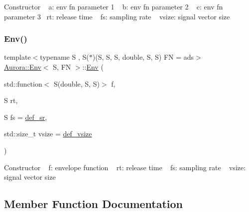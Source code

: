 Constructor ~\newline
a\+: env fn parameter 1 ~\newline
b\+: env fn parameter 2 ~\newline
c\+: env fn parameter 3~\newline
rt\+: release time ~\newline
fs\+: sampling rate ~\newline
vsize\+: signal vector size \mbox{\label{class_aurora_1_1_env_a500fe7e05d736a21c801ffa480aceed7}} 
\subsubsection{\texorpdfstring{Env()}{Env()}\hspace{0.1cm}{\footnotesize\ttfamily [3/3]}}
{\footnotesize\ttfamily template$<$typename S , S($\ast$)(\+S, S, S, double, S, S) FN = ads$>$ \\
\hyperlink{class_aurora_1_1_env}{Aurora\+::\+Env}$<$ S, FN $>$\+::\hyperlink{class_aurora_1_1_env}{Env} (\begin{DoxyParamCaption}\item[{std\+::function$<$ S(double, S, S)$>$}]{f,  }\item[{S}]{rt,  }\item[{S}]{fs = {\ttfamily \hyperlink{namespace_aurora_ad49263d809bea98dd422e95bc91bc03e}{def\+\_\+sr}},  }\item[{std\+::size\+\_\+t}]{vsize = {\ttfamily \hyperlink{namespace_aurora_afaaddf667a06e7ce23c667a8b7295263}{def\+\_\+vsize}} }\end{DoxyParamCaption})\hspace{0.3cm}{\ttfamily [inline]}}

Constructor ~\newline
f\+: envelope function ~\newline
rt\+: release time ~\newline
fs\+: sampling rate ~\newline
vsize\+: signal vector size 

\subsection{Member Function Documentation}
\mbox{\label{class_aurora_1_1_env_a8b83ca686cce4fc31b03b1de847bc062}} 
